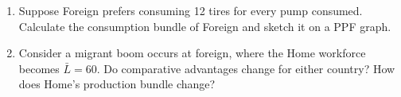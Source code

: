 \documentclass[12pt]{article}
\begin{document}
\begin{enumerate}[1)]
	\bigskip
	
	\bigskip
	
	\bigskip
	
	\bigskip
	
	\bigskip
	
	\bigskip  
	
	
	\newpage
	
	\item Suppose Foreign prefers consuming 12 tires for every pump consumed. Calculate the consumption bundle of Foreign and sketch it on a PPF graph. 
	
	\vspace{2in}
	
	\item Consider a migrant boom occurs at foreign, where the Home workforce becomes $\bar{L}=60$. Do comparative advantages change for either country?
	How does Home's production bundle change?
	
	\vspace{4in}
	
\end{enumerate}
\end{document}
